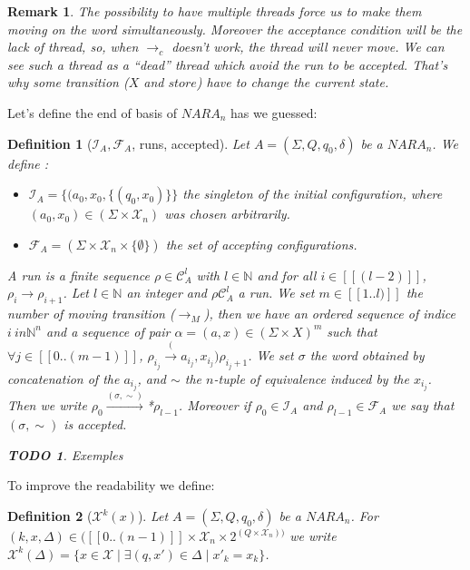 \documentclass[a4paper,10pt]{report}
\newtheorem{df}{Definition}
\newtheorem{rk}{Remark}
\newtheorem{td}{TODO}
\newcommand{\seg}[1]{[\![#1]\!]}
\newcommand{\ts}{\seg{0 .. (n-1)}}
\newcommand{\C}{\mathcal{C}_{A}}
\newcommand{\I}{\mathcal{I}_{A}}
\newcommand{\F}{\mathcal{F}_{A}}
\newcommand{\Xa}{\mathcal{X}}
\newcommand{\X}{\mathcal{X}_{n}}
\begin{document}
\begin{rk}
  \label{dead}
  The possibility to have multiple threads force us to make them moving on the word simultaneously. 
  Moreover the acceptance condition will be the lack of thread, so, when $\rightarrow_c$ doesn't work, the thread will never move.
  We can see such a thread as a ``dead'' thread which avoid the run to be accepted.
  That's why some transition ($X$ and $store$) have to change the current state.
\end{rk}
Let's define the end of basis of $NARA_n$ has we guessed:
\begin{df}[$\I,\F$, runs, accepted]
Let $A = (\Sigma ,Q ,q_0, \delta )$ be a $NARA_n$. We define :
\begin{itemize}
 \item $\I = \{(a_0,x_0,\{(q_0,x_0)\}\}$  the singleton of the initial configuration, where $(a_0,x_0) \in (\Sigma \times \X)$ was chosen arbitrarily.
 \item $\F = (\Sigma \times \X \times \{\emptyset\})$ the set of accepting configurations.
\end{itemize}
A run is a finite sequence $\rho \in \C^l$ with $l \in \mathbb N$ and for all $i \in \seg{(l-2)}$, $\rho_i \rightarrow \rho_{i+1}$.
Let $l \in \mathbb N$  an integer and $\rho \C^l$ a run.
We set $m \in \seg{1..l)}$ the number of moving transition ($\rightarrow_M$), then we have an ordered sequence of indice $i \ in {\mathbb N}^n$ and a sequence of pair $\alpha = (a,x) \in {(\Sigma \times X)}^m $
such that $\forall j \in \seg{0..(m-1)}$, $\rho_{i_j} \xrightarrow(a_{i_j},x_{i_j}) \rho_{i_j+1}$.
We set $\sigma$ the word obtained by concatenation of the $a_{i_j}$, and $\sim$ the $n$-tuple of equivalence induced by the $x_{i_j}$.
Then we write $\rho_0 \xrightarrow{(\sigma,\sim)}$*$ \rho_{l-1}$.
Moreover if $\rho_0 \in \I$ and $\rho_{l-1} \in \F$ we say that $(\sigma,\sim)$ is accepted.



\begin{td}
  Exemples
\end{td}


\end{df}

To improve the readability we define:
\begin{df}[$\Xa^k(x)$]
  Let $A = (\Sigma ,Q ,q_0, \delta )$ be a $NARA_n$.
  For $(k,x,\Delta) \in (\ts \times \X \times 2^{(Q\times \X)) } $ we write $\Xa^k(\Delta) = \{x \in \Xa \mid \exists (q,x') \in \Delta \mid x'_k = x_k\}$.
\end{df}
\end{document}
